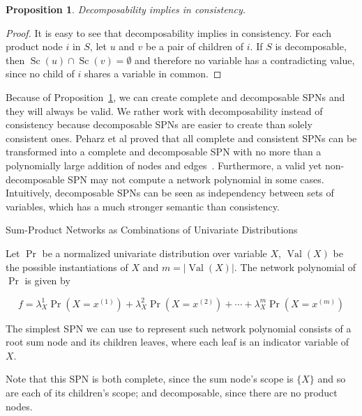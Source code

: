 \documentclass{amsart}
\makeatletter
\def\subsection{\@startsection{subsection}{3}%
  \z@{.5\linespacing\@plus.7\linespacing}{.1\linespacing}%
  {\normalfont\itshape}}
\DeclareMathOperator*{\Val}{\text{Val}}
\DeclareMathOperator*{\Sc}{\text{Sc}}
\theoremstyle{plain}
\newcounter{dummy-def}\numberwithin{dummy-def}{section}
\newcounter{dummy-thm}\numberwithin{dummy-thm}{section}
\newcounter{dummy-prop}\numberwithin{dummy-prop}{section}
\newtheorem{proposition}[dummy-prop]{Proposition}
\newcounter{dummy-ex}\numberwithin{dummy-ex}{section}
\newcounter{dummy-eg}\numberwithin{dummy-eg}{section}
\numberwithin{equation}{section}
\makeatother
\begin{document}
\begin{proposition}\label{decimpliescons}
  Decomposability implies in consistency.
\end{proposition}

\begin{proof}
  It is easy to see that decomposability implies in consistency. For each product node $i$ in $S$,
  let $u$ and $v$ be a pair of children of $i$. If $S$ is decomposable, then $\Sc(u)\cap\Sc(v)=
  \emptyset$ and therefore no variable has a contradicting value, since no child of $i$ shares a
  variable in common.
\end{proof}

Because of Proposition~\ref{decimpliescons}, we can create complete and decomposable SPNs and they
will always be valid. We rather work with decomposability instead of consistency because
decomposable SPNs are easier to create than solely consistent ones. Peharz et al proved that
all complete and consistent SPNs can be transformed into a complete and decomposable SPN with no
more than a polynomially large addition of nodes and edges~\cite{theoretical-spn}. Furthermore, a
valid yet non-decomposable SPN may not compute a network polynomial in some cases. Intuitively,
decomposable SPNs can be seen as independency between sets of variables, which has a much stronger
semantic than consistency.

\subsection{Sum-Product Networks as Combinations of Univariate Distributions}

Let $\Pr$ be a normalized univariate distribution over variable $X$, $\Val(X)$ be the possible
instantiations of $X$ and $m=|\Val(X)|$. The network polynomial of $\Pr$ is given by

\begin{equation*}
  f=\lambda_X^1\Pr(X=x^{(1)})+\lambda_X^2\Pr(X=x^{(2)})+\cdots+\lambda_X^m\Pr(X=x^{(m)})
\end{equation*}

The simplest SPN we can use to represent such network polynomial consists of a root sum node and
its children leaves, where each leaf is an indicator variable of $X$.

\begin{center}
  
\end{center}

Note that this SPN is both complete, since the sum node's scope is $\{X\}$ and so are each of its
children's scope; and decomposable, since there are no product nodes.


\newpage
\appendix

\newpage

\printbibliography[]
\end{document}

